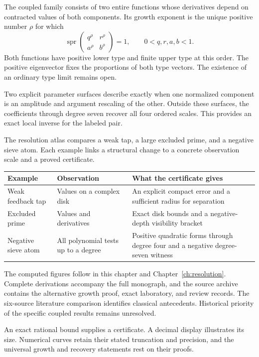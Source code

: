 The coupled family consists of two entire functions whose derivatives depend on
contracted values of both components. Its growth exponent is the unique
positive number $\rho$ for which
\[
\operatorname{spr}\begin{pmatrix}q^\rho&r^\rho\\a^\rho&b^\rho\end{pmatrix}=1,
\qquad 0<q,r,a,b<1.
\]
Both functions have positive lower type and finite upper type at this order.
The positive eigenvector fixes the proportions of both type vectors. The
existence of an ordinary type limit remains open.

Two explicit parameter surfaces describe exactly when one normalized component
is an amplitude and argument rescaling of the other. Outside these surfaces,
the coefficients through degree seven recover all four ordered scales. This
provides an exact local inverse for the labeled pair.

The resolution atlas compares a weak tap, a large excluded prime, and a negative
sieve atom. Each example links a structural change to a concrete observation
scale and a proved certificate.
\begin{center}
\renewcommand{\arraystretch}{1.35}
\begin{tabular}{@{}P{.22\linewidth}P{.31\linewidth}P{.39\linewidth}@{}}
\toprule
Example & Observation & What the certificate gives\\\midrule
Weak feedback tap & Values on a complex disk & An explicit compact error and a sufficient radius for separation\\
Excluded prime & Values and derivatives & Exact disk bounds and a negative-depth visibility bracket\\
Negative sieve atom & All polynomial tests up to a degree & Positive quadratic forms through degree four and a negative degree-seven witness\\
\bottomrule
\end{tabular}
\end{center}

The computed figures follow in this chapter and Chapter~\ref{ch:resolution}.
Complete derivations accompany the full monograph, and the source archive
contains the alternative growth proof, exact laboratory, and review records.
The six-source literature comparison identifies classical antecedents.
Historical priority of the specific coupled results remains unresolved.

An exact rational bound supplies a certificate. A decimal display illustrates
its size. Numerical curves retain their stated truncation and precision, and
the universal growth and recovery statements rest on their proofs.

